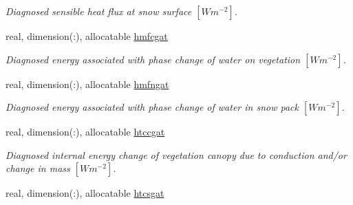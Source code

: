 \begin{DoxyCompactItemize}
\begin{DoxyCompactList}\small\item\em Diagnosed sensible heat flux at snow surface $[W m^{-2} ]$. \end{DoxyCompactList}\item 
\hypertarget{structclass__statevars_1_1class__gather_a87db9cfbd9765f237505db6f239da270}{}real, dimension(\+:), allocatable \hyperlink{structclass__statevars_1_1class__gather_a87db9cfbd9765f237505db6f239da270}{hmfcgat}\label{structclass__statevars_1_1class__gather_a87db9cfbd9765f237505db6f239da270}

\begin{DoxyCompactList}\small\item\em Diagnosed energy associated with phase change of water on vegetation $[W m^{-2} ]$. \end{DoxyCompactList}\item 
\hypertarget{structclass__statevars_1_1class__gather_a8c3a695d0736bb89d0497f8bc7ac710b}{}real, dimension(\+:), allocatable \hyperlink{structclass__statevars_1_1class__gather_a8c3a695d0736bb89d0497f8bc7ac710b}{hmfngat}\label{structclass__statevars_1_1class__gather_a8c3a695d0736bb89d0497f8bc7ac710b}

\begin{DoxyCompactList}\small\item\em Diagnosed energy associated with phase change of water in snow pack $[W m^{-2} ]$. \end{DoxyCompactList}\item 
\hypertarget{structclass__statevars_1_1class__gather_a451d81ee5ed15b6616dc9f680fa41193}{}real, dimension(\+:), allocatable \hyperlink{structclass__statevars_1_1class__gather_a451d81ee5ed15b6616dc9f680fa41193}{htccgat}\label{structclass__statevars_1_1class__gather_a451d81ee5ed15b6616dc9f680fa41193}

\begin{DoxyCompactList}\small\item\em Diagnosed internal energy change of vegetation canopy due to conduction and/or change in mass $[W m^{-2} ]$. \end{DoxyCompactList}\item 
\hypertarget{structclass__statevars_1_1class__gather_a8f91eb3305a8b9723d92936888e842d0}{}real, dimension(\+:), allocatable \hyperlink{structclass__statevars_1_1class__gather_a8f91eb3305a8b9723d92936888e842d0}{htcsgat}\label{structclass__statevars_1_1class__gather_a8f91eb3305a8b9723d92936888e842d0}


\end{DoxyCompactItemize}
